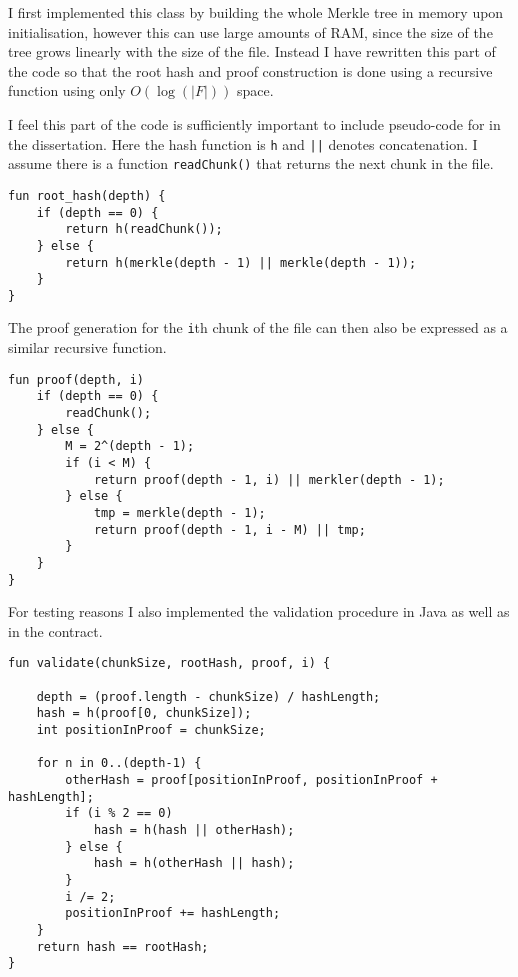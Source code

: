 \documentclass[12pt,a4paper,twoside,openright]{report}
\begin{document}
I first implemented this class by building the whole Merkle tree in memory upon initialisation,
 however this can use large amounts of RAM, since the size of the tree grows linearly with the size of the file.
Instead I have rewritten this part of the code so that the root hash and proof construction is done using a recursive function using only $O(\log(|F|))$ space.



I feel this part of the code is sufficiently important to include pseudo-code for in the dissertation.
Here the hash function is \texttt{h} and \texttt{||} denotes concatenation.
I assume there is a function \texttt{readChunk()} that returns the next chunk in the file.

\lstset{
breaklines=true,
basicstyle=\ttfamily\small,
tabsize=4
}
\begin{lstlisting}
fun root_hash(depth) {
    if (depth == 0) {
        return h(readChunk());
    } else {
        return h(merkle(depth - 1) || merkle(depth - 1));
    }
}
\end{lstlisting}

The proof generation for the \texttt{i}th chunk of the file can then also be expressed as a similar recursive function.

\begin{lstlisting}
fun proof(depth, i)
    if (depth == 0) {
        readChunk();
    } else {
        M = 2^(depth - 1);
        if (i < M) {
            return proof(depth - 1, i) || merkler(depth - 1);
        } else {
            tmp = merkle(depth - 1);
            return proof(depth - 1, i - M) || tmp;
        }
    }
}
\end{lstlisting}

For testing reasons I also implemented the validation procedure in Java as well as in the contract.

\begin{lstlisting}
fun validate(chunkSize, rootHash, proof, i) {
    
    depth = (proof.length - chunkSize) / hashLength;
    hash = h(proof[0, chunkSize]);
    int positionInProof = chunkSize;
    
    for n in 0..(depth-1) {
        otherHash = proof[positionInProof, positionInProof + hashLength];
        if (i % 2 == 0)
            hash = h(hash || otherHash);
        } else {
            hash = h(otherHash || hash);
        }
        i /= 2;
        positionInProof += hashLength;
    }
    return hash == rootHash;
}
\end{lstlisting}
\end{document}

